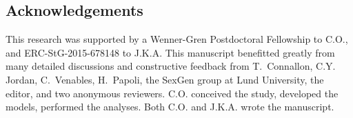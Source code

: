 \documentclass{article}[12pt]
\begin{document}
\subsection*{Acknowledgements}
This research was supported by a Wenner-Gren Postdoctoral Fellowship to C.O., and ERC-StG-2015-678148 to J.K.A. This manuscript benefitted greatly from many detailed discussions and constructive feedback from T.~Connallon, C.Y. Jordan, C.~Venables, H.~Papoli, the SexGen group at Lund University, the editor, and two anonymous reviewers. C.O. conceived the study, developed the models, performed the analyses. Both C.O. and J.K.A. wrote the manuscript.







\newpage


\end{document}
